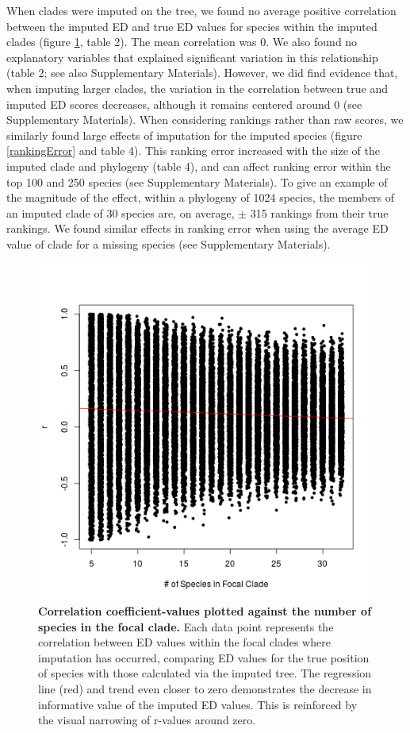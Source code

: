 \documentclass[12pt,english]{article}
\begin{document}
When clades were imputed on the tree, we found no average positive correlation
between the imputed ED and true ED values for species within the imputed clades
(figure \ref{imputationTrend}, table 2). The mean correlation was 0.
We also found no explanatory variables that explained significant variation in
this relationship (table 2; see also Supplementary Materials). However, we did
find evidence that, when imputing larger clades, the variation in the
correlation between true and imputed ED scores decreases, although it remains
centered around 0 (see Supplementary Materials). When considering rankings
rather than raw scores, we similarly found large effects of imputation for the
imputed species (figure \ref{rankingError} and table 4). This ranking error
increased with the size of the imputed clade and phylogeny (table 4), and can
affect ranking error within the top 100 and 250 species (see Supplementary
Materials). To give an example of the magnitude of the effect, within a
phylogeny of 1024 species, the members of an imputed clade of 30 species are, on
average, $\pm$ 315 rankings from their true rankings.
We found similar effects in ranking error when using the average
ED value of clade for a missing species (see Supplementary Materials).

\begin{figure}[!ht]
  \center
  \includegraphics[width=.5\textwidth]{edModel.png}
  \caption{\textbf{Correlation coefficient-values plotted against the number of
  species in the focal clade.} Each data point represents the correlation
  between ED values within the focal clades where imputation has occurred,
  comparing ED values for the true position of species with those calculated via
  the imputed tree. The regression line (red) and trend even closer to zero
  demonstrates the decrease in informative value of the imputed ED values. This
  is reinforced by the visual narrowing of r-values around zero.}
  \label{imputationTrend}
\end{figure}
\end{document}

